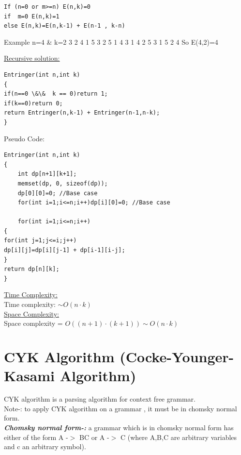 \documentclass[12pt]{book}
\begin{document}
\begin{lstlisting}
If (n=0 or m>=n) E(n,k)=0
if  m=0 E(n,k)=1
else E(n,k)=E(n,k-1) + E(n-1 , k-n)
\end{lstlisting}

Example n=4 \& k=2
	3 2 4 1 5
	3 2 5 1 4
	3 1 4 2 5
	3 1 5 2 4
So E(4,2)=4

\underline{Recursive solution:}\\
\begin{lstlisting}
Entringer(int n,int k)
{
if(n==0 \&\&  k == 0)return 1;
if(k==0)return 0;
return Entringer(n,k-1) + Entringer(n-1,n-k);
}
\end{lstlisting}

Pseudo Code:\\
\begin{lstlisting}
Entringer(int n,int k)
{
	int dp[n+1][k+1];
	memset(dp, 0, sizeof(dp));
	dp[0][0]=0; //Base case
	for(int i=1;i<=n;i++)dp[i][0]=0; //Base case

	for(int i=1;i<=n;i++)
{
for(int j=1;j<=i;j++)
dp[i][j]=dp[i][j-1] + dp[i-1][i-j];
}
return dp[n][k];
}
\end{lstlisting}

\underline{Time Complexity:}\\
Time complexity: $\sim O(n \cdot k)$\\

\underline{Space Complexity:}\\
Space complexity = $O((n+1) \cdot (k+1)) \sim O(n \cdot k)$\\

\chapter{CYK Algorithm (Cocke-Younger-Kasami Algorithm)}
CYK algorithm is a parsing algorithm for context free grammar.\\
Note-: to apply CYK algorithm on a grammar , it must be in chomsky normal form.\\

\textbf{\textit{Chomsky normal form-:}} a grammar which is in chomsky normal form has either of the form A -$>$ BC or A -$>$ C (where A,B,C are arbitrary variables and c an arbitrary symbol).\\
  
\end{document}
